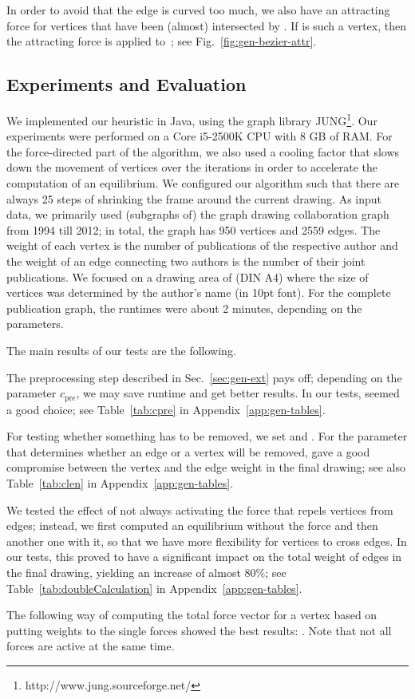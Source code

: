 \documentclass[]{llncs}
\newcommand{\cpre}{\ensuremath{c_\mathrm{pre}}\xspace}
\begin{document}
In order to avoid that the edge is curved too
much, we also have an attracting force for vertices that have been
(almost) intersected by . If  is such a vertex, then the
attracting force  is applied to~; see
Fig.~\ref{fig:gen-bezier-attr}.


\subsection{Experiments and Evaluation}
We implemented our heuristic in Java, using the graph library
JUNG\footnote{http://www.jung.sourceforge.net/}. Our experiments were
performed on a Core i5-2500K CPU with 8 GB of RAM. For the
force-directed part of the algorithm, we also used a cooling factor
that slows down the movement of vertices over the iterations in order
to accelerate the computation of an equilibrium. We configured our
algorithm such that there are always 25 steps of shrinking the frame
around the current drawing. As input data,
we primarily used (subgraphs of) the graph drawing collaboration graph
from 1994 till 2012; in total, the graph has 950 vertices and 2559
edges. The weight of each vertex is the number of
publications of the respective author and the weight of an edge
connecting two authors is the number of their joint publications.
We focused on a drawing area of  (DIN A4) where
the size of vertices was determined by the author's name (in 10pt
font). For the complete publication graph, the runtimes were about 2
minutes, depending on the parameters.

The main results of our tests are the following.
\begin{compactitem}
  \item The preprocessing step described in Sec.~\ref{sec:gen-ext}
    pays off; depending on the parameter \cpre, we may save
    runtime and get better results. In our tests,  seemed
		a good choice; see Table~\ref{tab:cpre} in
		Appendix~\ref{app:gen-tables}.


\item For testing whether something has to be removed, we set
     and . For the parameter
     that determines whether an edge or a vertex will be
    removed,  gave a good compromise between
    the vertex and the edge weight in the final drawing; see also
		Table~\ref{tab:clen} in Appendix~\ref{app:gen-tables}.
  \item We tested the effect of not always activating the force that repels
    vertices from edges; instead, we first computed an
    equilibrium without the force and then another one with it, so
    that we have more flexibility for vertices to cross edges. In our
    tests, this proved to have a significant impact on the total
    weight of edges in the final drawing, yielding an increase of
    almost 80\%; see Table~\ref{tab:doubleCalculation} in
		Appendix~\ref{app:gen-tables}.

  \item The following way of computing the total force
    vector  for a vertex based on putting weights to the single
    forces showed the best results: . Note that not
    all forces are active at the same time.
\end{compactitem}
\end{document}
